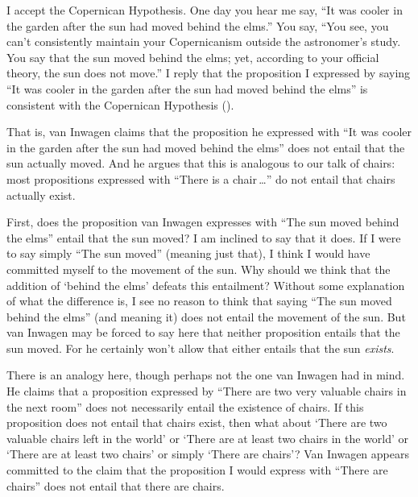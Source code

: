 \documentclass[11pt]{standalone}
\newenvironment{squote}{%
\begin{spacing}{1}
       	\begin{list}{}{%
\setlength{\labelwidth}{0pt}%
\rightmargin\leftmargin%
}
\item\relax
}{%
\end{list}%
\end{spacing}
}
\begin{document}
\begin{spacing}{1.5}
\begin{squote}
I accept the Copernican Hypothesis.  One day you hear me say, ``It was
cooler in the garden after the sun had moved behind the elms.''  You
say, ``You see, you can't consistently maintain your Copernicanism
outside the astronomer's study.  You say that the sun moved behind the
elms; yet, according to your official theory, the sun does not move.''
I reply that the proposition I expressed by saying ``It was cooler in
the garden after the sun had moved behind the elms'' is consistent
with the Copernican Hypothesis (\citeyear[101]{inwagen1995}).
\end{squote}
That is, van Inwagen claims that the proposition he expressed with
``It was cooler in the garden after the sun had moved behind the
elms'' does not entail that the sun actually moved.  And he argues
that this is analogous to our talk of chairs: most propositions
expressed with ``There is a chair\,\ldots '' do not entail that chairs
actually exist.

First, does the proposition van Inwagen expresses with ``The sun moved
behind the elms'' entail that the sun moved? I am inclined to say that
it does.  If I were to say simply ``The sun moved'' (meaning just
that), I think I would have committed myself to the movement of the
sun.  Why should we think that the addition of `behind the elms'
defeats this entailment?  Without some explanation of what the
difference is, I see no reason to think that saying ``The sun moved
behind the elms'' (and meaning it) does not entail the movement of the
sun.  But van Inwagen may be forced to say here that neither
proposition entails that the sun moved.  For he certainly won't allow
that either entails that the sun {\em exists}.

There is an analogy here, though perhaps not the one van Inwagen had
in mind.  He claims that a proposition expressed by ``There are two
very valuable chairs in the next room'' does not necessarily entail
the existence of chairs.  If this proposition does not entail that
chairs exist, then what about `There are two valuable chairs left in
the world' or `There are at least two chairs in the world' or `There
are at least two chairs' or simply `There are chairs'?  Van Inwagen
appears committed to the claim that the proposition I would express
with ``There are chairs'' does not entail that there are chairs.


\end{spacing}
\end{document}
